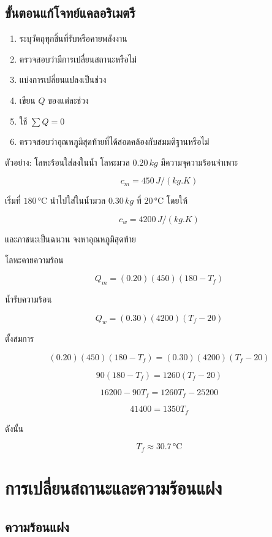 \subsection{ขั้นตอนแก้โจทย์แคลอริเมตรี}

\begin{enumerate}
    \item ระบุวัตถุทุกชิ้นที่รับหรือคายพลังงาน
    \item ตรวจสอบว่ามีการเปลี่ยนสถานะหรือไม่
    \item แบ่งการเปลี่ยนแปลงเป็นช่วง
    \item เขียน $Q$ ของแต่ละช่วง
    \item ใช้ $\sum Q=0$
    \item ตรวจสอบว่าอุณหภูมิสุดท้ายที่ได้สอดคล้องกับสมมติฐานหรือไม่
\end{enumerate}

\begin{examplebox}{ตัวอย่าง: โลหะร้อนใส่ลงในน้ำ}
โลหะมวล $0.20\,\si{kg}$ มีความจุความร้อนจำเพาะ

\[
c_m=450\,\si{J/(kg.K)}
\]

เริ่มที่ $180\,\si{\degreeCelsius}$ นำไปใส่ในน้ำมวล $0.30\,\si{kg}$ ที่ $20\,\si{\degreeCelsius}$ โดยให้

\[
c_w=4200\,\si{J/(kg.K)}
\]

และภาชนะเป็นฉนวน จงหาอุณหภูมิสุดท้าย

โลหะคายความร้อน

\[
Q_m=(0.20)(450)(180-T_f)
\]

น้ำรับความร้อน

\[
Q_w=(0.30)(4200)(T_f-20)
\]

ตั้งสมการ

\[
(0.20)(450)(180-T_f)
=
(0.30)(4200)(T_f-20)
\]

\[
90(180-T_f)=1260(T_f-20)
\]

\[
16200-90T_f=1260T_f-25200
\]

\[
41400=1350T_f
\]

ดังนั้น

\[
\boxed{T_f\approx 30.7\,\si{\degreeCelsius}}
\]
\end{examplebox}

\section{การเปลี่ยนสถานะและความร้อนแฝง}

\subsection{ความร้อนแฝง}

